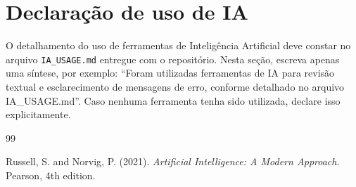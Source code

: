 \documentclass[12pt]{article}
\begin{document}
\section*{Declaração de uso de IA}
O detalhamento do uso de ferramentas de Inteligência Artificial deve constar no arquivo \texttt{IA\_USAGE.md} entregue com o repositório. Nesta seção, escreva apenas uma síntese, por exemplo: ``Foram utilizadas ferramentas de IA para revisão textual e esclarecimento de mensagens de erro, conforme detalhado no arquivo IA\_USAGE.md''. Caso nenhuma ferramenta tenha sido utilizada, declare isso explicitamente.

\begin{thebibliography}{99}

Russell, S. and Norvig, P. (2021). \textit{Artificial Intelligence: A Modern Approach}. Pearson, 4th edition.


\end{thebibliography}
\end{document}

